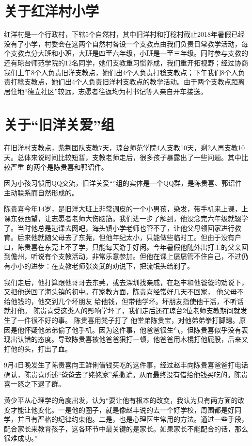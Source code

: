 \documentclass[12pt]{ctexart}
\begin{document}
\begin{appendix}
\section{关于红洋村小学}
红洋村是一个行政村，下辖5个自然村，其中旧洋村和打稔村截止2018年暑假已经没有了小学，村委会在这两个自然村各设一个支教点由我们负责日常教学活动，每个支教点分大班和小班，大班是四至六年级，小班是一至三年级。同时参与支教的还有琼台师范学院的12名同学，她们支教重习惯养成，我们重开拓视野；经过协商我们上午8个人负责旧洋支教点，她们出4个人负责打稔支教点；下午我们8个人负责打稔支教点，她们出4个人负责旧洋村支教点的教学活动。由于两个支教点距离居住地“德立社区”较远，志愿者往返均为村书记等人亲自开车接送。
\section{关于“旧洋关爱”组}
在旧洋村支教点，紫荆团队支教7天，琼台师范学院4人支教10天，剩2人再支教10天。总体来说时间比较短暂，支教老师走后，很多孩子暴露出了一些问题。其中比较严重
的两个是陈贵喜和郭诏件。

因为小孩习惯用QQ交流，旧洋关爱“”组的实体是一个QQ群，是陈贵喜、郭诏件主动联系而自然形成的。

陈贵喜今年14岁，是旧洋大班上非常调皮的一个小男孩，染发，带手机来上课，上课东张西望，让志愿者老师大伤脑筋。我们进一步了解到，他没念完六年级就辍学了。当时他总是逃课去网吧，海头镇小学老师也管不了，让他父母领回家进行教育。后来他就随父母去了东莞，但他年纪太小，只能做些临时工。但由于没有户口，陈贵喜在东莞上不了学，只能每天游手好闲。今年暑假他随外出打工的父亲回到儋州，听说有个支教活动，非常乐意参加。但他在课上屡屡管不住自己，不过仍有小小的进步：在支教老师张炎武的劝说下，把流氓头给剃了。

我们走后，他打算跟他哥哥去东莞，或去深圳找亲戚，在赵丰和他爸爸的劝说下，又把他送回了海头镇的初中。在家教方面，陈贵喜经常好几天不回家，
他父母不给他钱的，他交到几个坏朋友
给他钱，但带他学坏。坏朋友指使他干活，不听话就打他。
陈贵喜受这类人的影响学坏了，我们走后还在琼台2位老师支教期间就发生了一件很不好的事。
陈贵喜用凳子打了
他堂弟陈贵宝，对他弟弟拳打脚踢。原因是他怀疑他弟弟偷了他手机。因为这件事，他爸爸很生气，但陈贵喜似乎没有表现出认错的态度。导致陈贵喜被他爸爸狠打一顿，他爸爸用木棍打他屁股，后来又打他的头，打出了血。

9月4日晚发生了陈贵喜向王鲜俐借钱买吃的这件事，经过赵丰向陈贵喜爸爸打电话确认，陈贵喜所述“爸爸去了姥姥家”系撒谎。从而最终没有借给他钱买吃的。陈贵喜一怒之下退了群。

黄少平从心理学的角度出发，认为“要让他有根本的改变，我认为只有两方面的改变才能让他变化。一是他的圈子，就是像赵丰说的去一个好学校，周围都是好同学，并且有严格的纪律约束他。二是，也是心理医生常用的方法。通过一些手段，配合家长来教育孩子，这各环节中最关键的是家长。如果家长不能配合的话，那么很难成功。”


\end{appendix}
\end{document}

